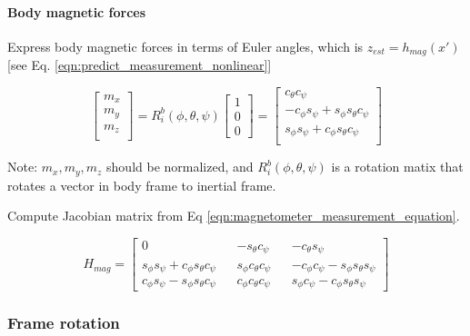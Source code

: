 \documentclass[]{article}
\begin{document}
\paragraph{Body magnetic forces}
Express body magnetic forces in terms of Euler angles, which is $z_{est} = h_{mag}(x')$ [see Eq. \eqref{eqn:predict_measurement_nonlinear}]

\begin{equation}
	\begin{bmatrix}
		m_x \\
		m_y \\
		m_z \\
	\end{bmatrix} = 
	R_{i}^{b}(\phi, \theta, \psi)
	\begin{bmatrix}
		1 \\
		0 \\
		0
	\end{bmatrix} = 
	\begin{bmatrix}
		c_\theta c_\psi \\
		-c_\phi s_\psi + s_\phi s_\theta c_\psi \\
		s_\phi s_\psi + c_\phi s_\theta c_\psi \\
	\end{bmatrix}\label{eqn:magnetometer_measurement_equation}
\end{equation}

Note: $m_x, m_y, m_z$ should be normalized, and $R_{i}^{b}(\phi, \theta, \psi)$ is a rotation matix that rotates a vector in body frame to inertial frame.

Compute Jacobian matrix from Eq \eqref{eqn:magnetometer_measurement_equation}.

\begin{equation}
	H_{mag} = 
	\begin{bmatrix}
		0 && -s_\theta c_\psi && -c_\theta s_\psi \\
		s_\phi s_\psi + c_\phi s_\theta c_\psi && s_\phi c_\theta c_\psi && -c_\phi c_\psi - s_\phi s_\theta s_\psi \\
		c_\phi s_\psi - s_\phi s_\theta c_\psi && c_\phi c_\theta c_\psi && s_\phi c_\psi - c_\phi s_\theta s_\psi
	\end{bmatrix}\label{eqn:H_accelerometer}
\end{equation}

\subsubsection{Frame rotation}
\end{document}
